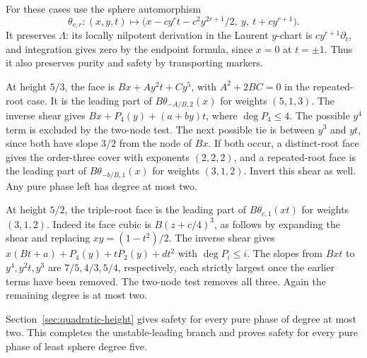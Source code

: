 For these cases use the sphere automorphism
\[
 \theta_{c,r}:(x,y,t)\longmapsto
 \bigl(x-cy^r t-c^2y^{2r+1}/2,\ y,\ t+cy^{r+1}\bigr).
\]
It preserves \(\Lambda\): its locally nilpotent derivation in the
Laurent \(y\)-chart is \(cy^{r+1}\partial_t\), and integration gives
zero by the endpoint formula, since \(x=0\) at \(t=\pm1\). Thus it also
preserves purity and safety by transporting markers.

At height \(5/3\), the face is \(Bx+Ay^2t+Cy^5\), with
\(A^2+2BC=0\) in the repeated-root case. It is the leading part of
\(B\theta_{-A/B,2}(x)\) for weights \((5,1,3)\). The inverse shear gives
\(Bx+P_4(y)+(a+b y)t\), where \(\deg P_4\le4\). The possible \(y^4\) term
is excluded by the two-node test. The next possible tie is between \(y^3\)
and \(yt\), since both have slope \(3/2\) from the node of \(Bx\). If both
occur, a distinct-root face gives the order-three cover with exponents
\((2,2,2)\), and a repeated-root face is the leading part of
\(B\theta_{-b/B,1}(x)\) for weights \((3,1,2)\). Invert this shear as well.
Any pure phase left has degree at most two.

At height \(5/2\), the triple-root face is the leading part of
\(B\theta_{c,1}(xt)\) for weights \((3,1,2)\). Indeed its face cubic is
\(B(z+c/4)^3\), as follows by expanding the shear and replacing
\(xy=(1-t^2)/2\). The inverse shear gives
\(x(Bt+a)+P_4(y)+tP_2(y)+d t^2\) with \(\deg P_i\le i\). The slopes from
\(Bxt\) to \(y^4,y^2t,y^3\) are \(7/5,4/3,5/4\), respectively, each strictly
largest once the earlier terms have been removed. The two-node test
removes all three. Again the remaining degree is at most two.

Section~\ref{sec:quadratic-height} gives safety for every pure phase of
degree at most two. This completes the unstable-leading branch and proves
safety for every pure phase of least sphere degree five.
